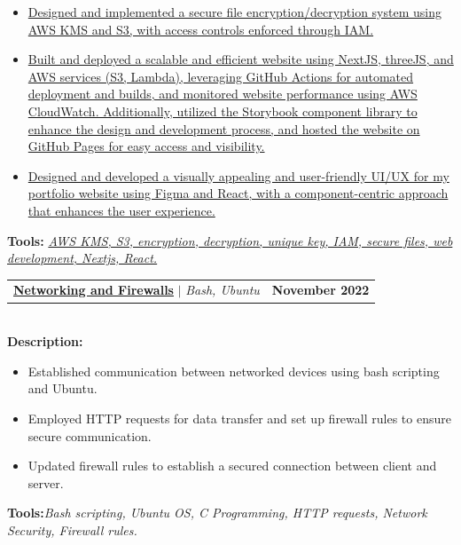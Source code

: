 \documentclass[letterpaper,11pt]{article}
\makeatletter
\newcommand{\resumeItem}[1]{
  \item\small{
    {#1 \vspace{-2pt}}
  }
}
\newcommand{\resumeProjectHeading}[2]{
    \item
    \begin{tabular*}{1.001\textwidth}{l@{\extracolsep{\fill}}r}
      \small#1 & \textbf{\small #2}\\
    \end{tabular*}\vspace{-7pt}
}
\newcommand{\resumeItemListStart}{\begin{itemize}}
\newcommand{\resumeItemListEnd}{\end{itemize}\vspace{-5pt}}
\makeatother
\begin{document}
          \vspace{-5pt}
          \resumeItemListStart
            \resumeItem{\href{https://yakkshit.com}{Designed and implemented a secure file encryption/decryption system using AWS KMS and S3, with access controls enforced through IAM.}}
            \resumeItem{\href{https://yakkshit.com}{Built and deployed a scalable and efficient website using NextJS, threeJS, and AWS services (S3, Lambda), leveraging GitHub Actions for automated deployment and builds, and monitored website performance using AWS CloudWatch. Additionally, utilized the Storybook component library to enhance the design and development process, and hosted the website on GitHub Pages for easy access and visibility.}}
            \resumeItem{\href{https://yakkshit.com}{Designed and developed a visually appealing and user-friendly UI/UX for my portfolio website using Figma and React, with a component-centric approach that enhances the user experience.}}
          \resumeItemListEnd
          \vspace{-2pt}
          \textbf{Tools:}\emph{ \href{https://yakkshit.com}{AWS KMS, S3, encryption, decryption, unique key, IAM, secure files, web development, Nextjs, React.}}
          \vspace{-18pt}
          \resumeProjectHeading
          {\textbf{\href{https://github.com/saiyakkshit?tab=repositories}{Networking and Firewalls}} $|$ \emph{Bash, Ubuntu}}{November 2022}\\
          \vspace{6pt}
          \textbf{Description:}
           \vspace{-5pt}
          \resumeItemListStart
            \resumeItem{Established communication between networked devices using bash scripting and Ubuntu.}
            \resumeItem{Employed HTTP requests for data transfer and set up firewall rules to ensure secure communication.}
            \resumeItem{Updated firewall rules to establish a secured connection between client and server.}           
          \resumeItemListEnd 
          \textbf{Tools:}\emph{Bash scripting,
Ubuntu OS,
C Programming,
HTTP requests, Network Security,
Firewall rules.}
          \vspace{-18pt}
\end{document}
